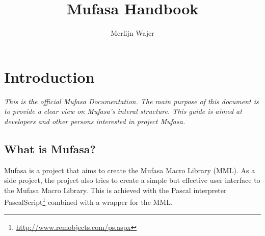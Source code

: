 \documentclass[a4paper, 10pt]{report} %
\begin{document}
\title{Mufasa Handbook}
\author{Merlijn Wajer}
\maketitle
\tableofcontents

\chapter{Introduction}

\emph{This is the official Mufasa Documentation.
The main purpose of this document is to provide a clear view on Mufasa's 
interal structure. This guide is aimed at developers and other persons
interested in project Mufasa.}

\section{What is Mufasa?}

Mufasa is a project that aims to create the Mufasa Macro Library (MML).
As a side project, the project also tries to create a simple but effective
user interface to the Mufasa Macro Library. This is achieved with the
Pascal interpreter PascalScript\footnote{\url{http://www.remobjects.com/ps.aspx}}
combined with a wrapper for the MML.
\end{document}
